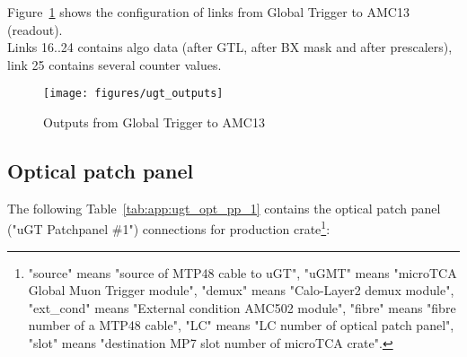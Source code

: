 Figure~\ref{fig:app:ugt_outputs} shows the configuration of links from Global Trigger to AMC13 (readout).\\
Links 16..24 contains algo data (after GTL, after BX mask and after prescalers), link 25 contains several counter values.

\begin{figure}[htb]
\centering
\texttt{[image: figures/ugt\_outputs]}
\caption{Outputs from Global Trigger to AMC13}
\label{fig:app:ugt_outputs}
\end{figure}

\clearpage

\subsection{Optical patch panel}\label{sec:app:app_d}

The following Table~\ref{tab:app:ugt_opt_pp_1} contains the optical patch panel ("uGT Patchpanel \#1") connections for production crate\footnote{"source" means "source of MTP48 cable to uGT", "uGMT" means "microTCA Global Muon Trigger module", "demux" means "Calo-Layer2 demux module", "ext\_cond" means "External condition AMC502 module", "fibre" means "fibre number of a MTP48 cable", "LC" means "LC number of optical patch panel", "slot" means "destination MP7 slot number of microTCA crate".\label{note_ugt_opt_pp_1}}:

